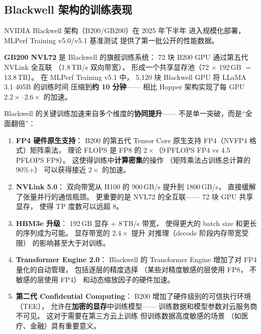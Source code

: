 \subsection{Blackwell 架构的训练表现}

NVIDIA Blackwell 架构（B200/GB200）在 2025 年下半年
进入规模化部署，MLPerf Training v5.0/v5.1 基准测试
提供了第一批公开的性能数据。

\textbf{GB200 NVL72} 是 Blackwell 的旗舰训练系统：
72 块 B200 GPU 通过第五代 NVLink 全互联
（1.8\,TB/s 双向带宽），
形成一个共享显存池（72 $\times$ 192\,GB $=$ 13.8\,TB）。
在 MLPerf Training v5.1 中，
5,120 块 Blackwell GPU 将 LLaMA 3.1 405B 的训练时间
压缩到\textbf{约 10 分钟}——
相比 Hopper 架构实现了每 GPU $2.2\times$--$2.6\times$ 的加速。

Blackwell 的关键训练加速来自多个维度的\textbf{协同提升}——
不是单一突破，而是``全面翻倍''：

\begin{enumerate}[noitemsep]
  \item \textbf{FP4 硬件原生支持}：
        B200 的第五代 Tensor Core
        原生支持 FP4（NVFP4 格式）矩阵乘法，
        理论 FLOPS 是 FP8 的 $2\times$（9\,PFLOPS FP4 vs 4.5\,PFLOPS FP8）。
        这使得训练中\textbf{计算密集}的操作
        （矩阵乘法占训练总计算的 90\%+）
        可以获得接近 $2\times$ 的加速。
  \item \textbf{NVLink 5.0}：
        双向带宽从 H100 的 900\,GB/s 提升到 1800\,GB/s，
        直接缓解了张量并行的通信瓶颈。
        更重要的是 NVL72 的全互联——
        72 块 GPU 共享显存，
        使得 TP 度数可以远超 8。
  \item \textbf{HBM3e 升级}：
        192\,GB 显存 + 8\,TB/s 带宽，
        使得更大的 batch size 和更长的序列成为可能。
        显存带宽的 $2.4\times$ 提升
        对推理（decode 阶段内存带宽受限）
        的影响甚至大于对训练。
  \item \textbf{Transformer Engine 2.0}：
        Blackwell 的 Transformer Engine
        增加了对 FP4 量化的自动管理，
        包括逐层的精度选择
        （某些对精度敏感的层使用 FP8，
        不敏感的层使用 FP4）
        和动态缩放因子的硬件加速。
  \item \textbf{第二代 Confidential Computing}：
        B200 增加了硬件级别的可信执行环境（TEE），
        允许在\textbf{加密的显存}中训练模型——
        训练数据和模型参数对云服务商不可见。
        这对于需要在第三方云上训练
        但训练数据高度敏感的场景
        （如医疗、金融）具有重要意义。
\end{enumerate}

